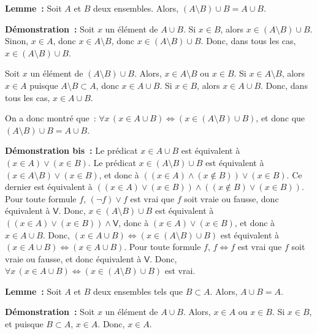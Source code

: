 \medskip

\noindent\textbf{Lemme :} Soit $A$ et $B$ deux ensembles.
    Alors, $(A \setminus B) \cup B = A \cup B$.

\medskip

\noindent\textbf{Démonstration :}
    Soit $x$ un élément de $A \cup B$. 
    Si $x \in B$, alors $x \in (A \setminus B) \cup B$.
    Sinon, $x \in A$, donc $x \in A \setminus B$, donc $x \in (A \setminus B) \cup B$.
    Donc, dans tous les cas, $x \in (A \setminus B) \cup B$.

    Soit $x$ un élément de $(A \setminus B) \cup B$.
    Alors, $x \in A \setminus B$ ou $x \in B$. 
    Si $x \in A \setminus B$, alors $x \in A$ puisque $A \setminus B \subset A$, donc $x \in A \cup B$.
    Si $x \in B$, alors $x \in A \cup B$.
    Donc, dans tous les cas, $x \in A \cup B$.

    On a donc montré que : $\forall x \, (x \in A \cup B) \Leftrightarrow (x \in (A \setminus B) \cup B)$, et donc que $(A \setminus B) \cup B = A \cup B$.

    \done

\medskip

\noindent\textbf{Démonstration bis :} 
    Le prédicat $x \in A \cup B$ est équivalent à $(x \in A) \vee (x \in B)$.
    Le prédicat $x \in (A \setminus B) \cup B$ est équivalent à $(x \in A \setminus B) \vee (x \in B)$, et donc à $((x \in A) \wedge (x \notin B)) \vee (x \in B)$.
    Ce dernier est équivalent à $((x \in A) \vee (x \in B)) \wedge ((x \notin B) \vee (x \in B))$.
    Pour toute formule $f$, $(\neg f) \vee f$ est vrai que $f$ soit vraie ou fausse, donc équivalent à $\mathsf{V}$.
    Donc, $x \in (A \setminus B) \cup B$ est équivalent à $((x \in A) \vee (x \in B)) \wedge \mathsf{V}$, donc à $(x \in A) \vee (x \in B)$, et donc à $x \in A \cup B$.
    Donc, $(x \in A \cup B) \Leftrightarrow (x \in (A \setminus B) \cup B)$ est équivalent à $(x \in A \cup B) \Leftrightarrow (x \in A \cup B)$.
    Pour toute formule $f$, $f \Leftrightarrow f$ est vrai que $f$ soit vraie ou fausse, et donc équivalent à $\mathsf{V}$.
    Donc, $\forall x \, (x \in A \cup B) \Leftrightarrow (x \in (A \setminus B) \cup B)$ est vrai.

\done

\medskip

\noindent\textbf{Lemme :} Soit $A$ et $B$ deux ensembles tels que $B \subset A$.
    Alors, $A \cup B = A$.

\medskip

\noindent\textbf{Démonstration :}
    Soit $x$ un élément de $A \cup B$. 
    Alors, $x \in A$ ou $x \in B$.
    Si $x \in B$, et puisque $B \subset A$, $x \in A$.
    Donc, $x \in A$.

